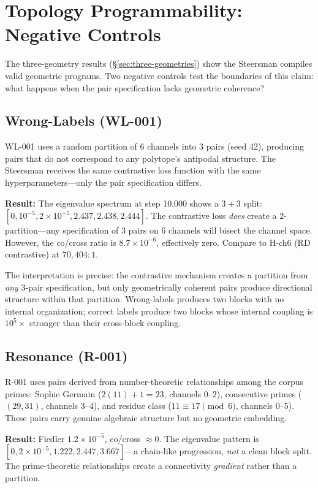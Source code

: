 \section{Topology Programmability: Negative Controls}
\label{sec:negative-controls}

The three-geometry results (\S\ref{sec:three-geometries}) show the Steersman
compiles valid geometric programs. Two negative controls test the boundaries
of this claim: what happens when the pair specification lacks geometric
coherence?

\subsection{Wrong-Labels (WL-001)}

WL-001 uses a random partition of 6 channels into 3 pairs (seed 42),
producing pairs that do not correspond to any polytope's antipodal structure.
The Steersman receives the same contrastive loss function with the same
hyperparameters---only the pair specification differs.

\textbf{Result:} The eigenvalue spectrum at step 10{,}000 shows a $3{+}3$
split: $[0, 10^{-5}, 2{\times}10^{-5}, 2.437, 2.438, 2.444]$. The
contrastive loss \emph{does} create a 2-partition---any specification of 3
pairs on 6 channels will bisect the channel space. However, the co/cross
ratio is $8.7 \times 10^{-6}$, effectively zero. Compare to H-ch6 (RD
contrastive) at $70{,}404{:}1$.

The interpretation is precise: the contrastive mechanism creates a partition
from \emph{any} 3-pair specification, but only geometrically coherent pairs
produce directional structure within that partition. Wrong-labels produces
two blocks with no internal organization; correct labels produce two blocks
whose internal coupling is $10^5\times$ stronger than their cross-block
coupling.

\subsection{Resonance (R-001)}

R-001 uses pairs derived from number-theoretic relationships among the corpus
primes: Sophie Germain ($2(11){+}1{=}23$, channels 0--2), consecutive primes
($(29,31)$, channels 3--4), and residue class ($11 \equiv 17 \pmod{6}$,
channels 0--5). These pairs carry genuine algebraic structure but no
geometric embedding.

\textbf{Result:} Fiedler $1.2 \times 10^{-5}$, co/cross $\approx 0$.
The eigenvalue pattern is $[0, 2{\times}10^{-5}, 1.222, 2.447, 3.667]$---a
chain-like progression, \emph{not} a clean block split. The prime-theoretic
relationships create a connectivity \emph{gradient} rather than a partition.

